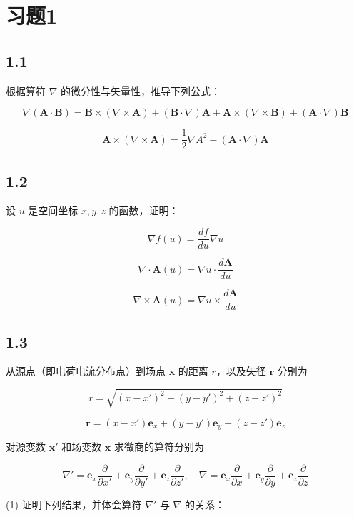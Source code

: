 \section{习题1}


\newpage
\subsection{1.1}
根据算符 $\nabla$ 的微分性与矢量性，推导下列公式：

$$\nabla (\boldsymbol{A} \cdot \boldsymbol{B}) = \boldsymbol{B} \times (\nabla \times \boldsymbol{A}) + (\boldsymbol{B} \cdot \nabla)\boldsymbol{A} + \boldsymbol{A} \times (\nabla \times \boldsymbol{B}) + (\boldsymbol{A} \cdot \nabla)\boldsymbol{B}$$

$$\boldsymbol{A} \times (\nabla \times \boldsymbol{A}) = \frac{1}{2} \nabla A^2 - (\boldsymbol{A} \cdot \nabla)\boldsymbol{A}$$

\newpage
\subsection{1.2}
设 $u$ 是空间坐标 $x, y, z$ 的函数，证明：

$$\nabla f(u) = \frac{df}{du} \nabla u$$

$$\nabla \cdot \boldsymbol{A}(u) = \nabla u \cdot \frac{d\boldsymbol{A}}{du}$$

$$\nabla \times \boldsymbol{A}(u) = \nabla u \times \frac{d\boldsymbol{A}}{du}$$

\newpage
\subsection{1.3}
从源点（即电荷电流分布点）到场点 $\boldsymbol{x}$ 的距离 $r$，以及矢径 $\boldsymbol{r}$ 分别为

$$r = \sqrt{(x - x')^2 + (y - y')^2 + (z - z')^2}$$

$$\boldsymbol{r} = (x - x') \boldsymbol{e}_x + (y - y') \boldsymbol{e}_y + (z - z') \boldsymbol{e}_z$$

对源变数 $\boldsymbol{x}'$ 和场变数 $\boldsymbol{x}$ 求微商的算符分别为

$$\nabla' = \boldsymbol{e}_x \frac{\partial}{\partial x'} + \boldsymbol{e}_y \frac{\partial}{\partial y'} + \boldsymbol{e}_z \frac{\partial}{\partial z'}, \quad \nabla = \boldsymbol{e}_x \frac{\partial}{\partial x} + \boldsymbol{e}_y \frac{\partial}{\partial y} + \boldsymbol{e}_z \frac{\partial}{\partial z}$$

(1) 证明下列结果，并体会算符 $\nabla'$ 与 $\nabla$ 的关系：

